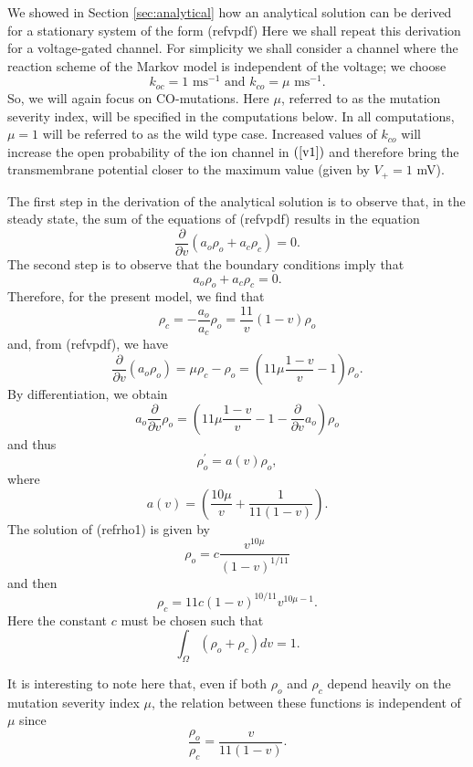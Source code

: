We showed in Section \ref{sec:analytical} how an analytical solution can be derived
for a stationary system of the form (ref{vpdf}) Here we
shall repeat this derivation for a voltage-gated channel. For simplicity we
shall consider a channel where the reaction scheme of the Markov model is
independent of the voltage; we choose
\[
k_{oc}=1\text{ ms}^{-1}\text{ and }k_{co}=\mu\text{ ms}^{-1}.
\]
So, we will again focus on CO-mutations.
Here $\mu$, referred to as the mutation severity index,
 will be specified in the computations below.  In all computations, $\mu=1$ will be 
 referred to as the wild type case. Increased values of
$k_{co}$ will increase the open probability of the ion channel in $\left(
\ref{v1}\right)  $ and therefore bring the transmembrane potential closer to
the maximum  value (given by $V_{+}=1$ mV). 

The first step in the derivation of the analytical solution is to observe that, in the
steady state, the sum of the equations of (ref{vpdf}) results
in the equation
\[
\frac{\partial}{\partial v}\left(  a_{o}\rho_{o}+a_{c}\rho_{c}\right)  =0.
\]
The second step is to observe that the boundary conditions imply that
\[
a_{o}\rho_{o}+a_{c}\rho_{c}=0.
\]
Therefore, for the present model, we find that
\[
\rho_{c}=-\frac{a_{o}}{a_{c}}\rho_{o}=\frac{11}{v}\left(  1-v\right)  \rho_{o}
\]
and, from (ref{vpdf}), we have
\[
\frac{\partial}{\partial v}\left(  a_{o}\rho_{o}\right)  =\mu\rho_{c}-\rho
_{o}=\left(  11\mu\frac{1-v}{v}-1\right)  \rho_{o}.
\]
By differentiation, we obtain
\[
a_{o}\frac{\partial}{\partial v}\rho_{o}=\left(  11\mu\frac{1-v}{v}
-1-\frac{\partial}{\partial v}a_{o}\right)  \rho_{o}
\]
and thus
\begin{equation}
\rho_{o}^{\prime}=a(v)\rho_{o}, \label{rho1}
\end{equation}
where
\[
a(v)=\left(  \frac{10\mu}{v}+\frac{1}{11(1-v)}\right)  .
\]
The solution of (ref{rho1}) is given by
\begin{equation}
\rho_{o}=c\frac{v^{10\mu}}{\left(  1-v\right)  ^{1/11}}\label{rho2}
\end{equation}
and then
\[
\rho_{c}=11 c \left(  1-v\right)  ^{10/11}v^{10\mu-1}.
\]
Here the constant $c$ must be chosen such that
\[
\int_{\Omega}\left(  \rho_{o}+\rho_{c}\right)  dv=1.
\]

It is interesting to note here that, even if both $\rho_o$ and $\rho_c$ depend heavily on the mutation severity 
index $\mu$, the relation between these functions is independent of $\mu$ since
\[ \frac{\rho_o}{\rho_c}=\frac{v}{11(1-v)}. \]


